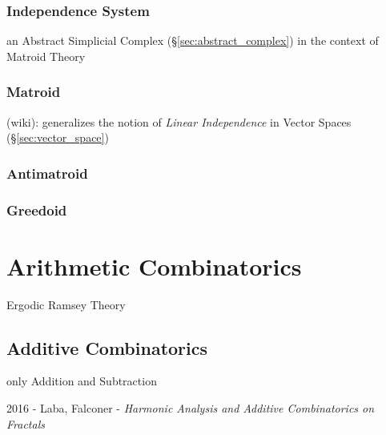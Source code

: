 \subsubsection{Independence System}\label{sec:independence_system}

an Abstract Simplicial Complex (\S\ref{sec:abstract_complex}) in the context of
Matroid Theory



\subsubsection{Matroid}\label{sec:matroid}

(wiki): generalizes the notion of \emph{Linear Independence} in Vector Spaces
(\S\ref{sec:vector_space})



\subsubsection{Antimatroid}\label{sec:antimatroid}

\subsubsection{Greedoid}\label{sec:greedoid}



\section{Arithmetic Combinatorics}\label{sec:arithmetic_combinatorics}

Ergodic Ramsey Theory



\subsection{Additive Combinatorics}\label{sec:additive_combinatorics}

only Addition and Subtraction

2016 - Laba, Falconer - \emph{Harmonic Analysis and Additive Combinatorics on
  Fractals}



